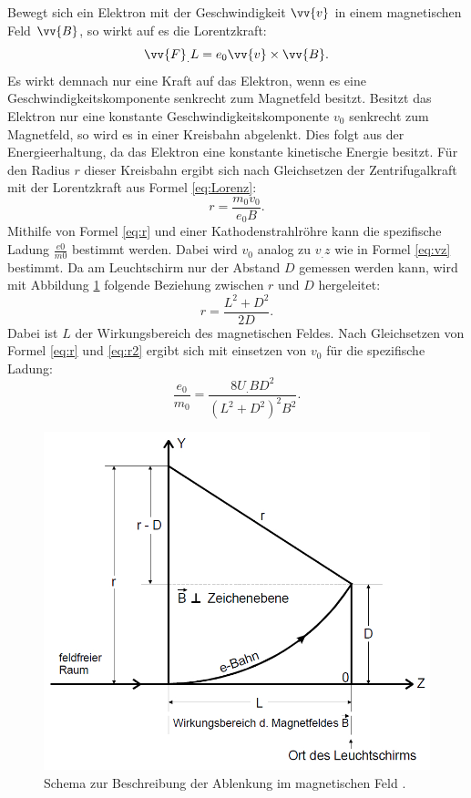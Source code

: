 Bewegt sich ein Elektron mit der Geschwindigkeit $\vv{v}$ in einem magnetischen Feld $\vv{B}$, so wirkt auf es die Lorentzkraft:
\begin{equation}
\vv{F}_.L = e_0\vv{v}\times\vv{B}\text{.}\label{eq:Lorenz}
\end{equation}
Es wirkt demnach nur eine Kraft auf das Elektron, wenn es eine Geschwindigkeitskomponente senkrecht zum Magnetfeld besitzt.
Besitzt das Elektron nur eine konstante Geschwindigkeitskomponente $v_0$ senkrecht zum Magnetfeld, so wird es in einer Kreisbahn abgelenkt. Dies folgt aus der Energieerhaltung, da das Elektron eine konstante kinetische Energie besitzt. Für den Radius $r$ dieser Kreisbahn ergibt sich nach Gleichsetzen der Zentrifugalkraft mit der Lorentzkraft aus Formel \eqref{eq:Lorenz}:
\begin{equation}
r = \frac{m_0v_0}{e_0B}\text{.}\label{eq:r}
\end{equation}
Mithilfe von Formel \eqref{eq:r} und einer Kathodenstrahlröhre kann die spezifische Ladung $\frac{e0}{m0}$ bestimmt werden. Dabei wird $v_0$ analog zu $v_.z$ wie in Formel \eqref{eq:vz} bestimmt.
Da am Leuchtschirm nur der Abstand $D$ gemessen werden kann, wird mit Abbildung \ref{fig:B-Feld} folgende Beziehung zwischen $r$ und $D$ hergeleitet:
\begin{equation}
r = \frac{L^2+D^2}{2D}\text{.}\label{eq:r2}
\end{equation}
Dabei ist $L$ der Wirkungsbereich des magnetischen Feldes. Nach Gleichsetzen von Formel \eqref{eq:r} und \eqref{eq:r2} ergibt sich mit einsetzen von $v_0$ für die spezifische Ladung:
\begin{equation}
\frac{e_0}{m_0} = \frac{8U_.BD^2}{(L^2+D^2)^2B^2}\text{.}\label{eq:e0/m0}
\end{equation}

\begin{figure}
\centering
\includegraphics[width=\linewidth-70pt,height=\textheight-70pt,keepaspectratio]{content/images/Ablenkung-Im-B-Feld.jpg}
\caption{Schema zur Beschreibung der Ablenkung im magnetischen Feld \cite{V502}.}
\label{fig:B-Feld}
\end{figure}